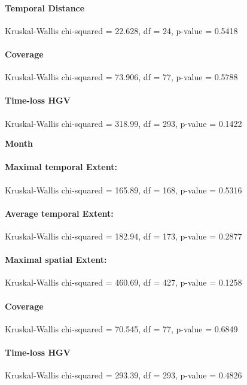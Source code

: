 \paragraph{Temporal Distance}
Kruskal-Wallis chi-squared = 22.628, df = 24, p-value = 0.5418

\paragraph{Coverage}
Kruskal-Wallis chi-squared = 73.906, df = 77, p-value = 0.5788

\paragraph{Time-loss HGV}
Kruskal-Wallis chi-squared = 318.99, df = 293, p-value = 0.1422

\large
\centerline{\textbf{Month}}
\normalsize

\paragraph{Maximal temporal Extent:}
Kruskal-Wallis chi-squared = 165.89, df = 168, p-value = 0.5316

\paragraph{Average temporal Extent:}
Kruskal-Wallis chi-squared = 182.94, df = 173, p-value = 0.2877

\paragraph{Maximal spatial Extent:}
Kruskal-Wallis chi-squared = 460.69, df = 427, p-value = 0.1258

\paragraph{Coverage}
Kruskal-Wallis chi-squared = 70.545, df = 77, p-value = 0.6849

\paragraph{Time-loss HGV}
Kruskal-Wallis chi-squared = 293.39, df = 293, p-value = 0.4826